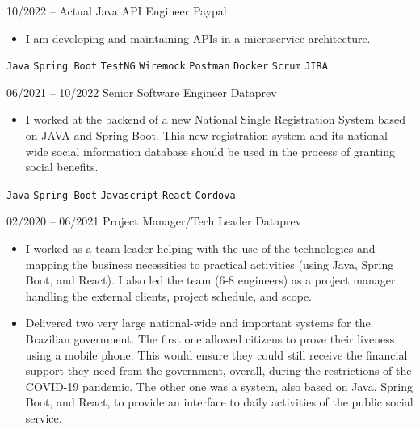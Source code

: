 \begin{entrylist}

	\entry
        {10/2022 -- Actual}
		{Java API Engineer}
		{Paypal} 
		{\vspace{-10pt}
        \begin{itemize}[noitemsep,topsep=0pt,parsep=0pt,partopsep=0pt, leftmargin=-1pt]
            \item I am developing and maintaining APIs in a microservice architecture. 
        \end{itemize} 
        \texttt{Java} \slashsep \texttt{Spring Boot} \slashsep \texttt{TestNG} \slashsep  \texttt{Wiremock} \slashsep \texttt{Postman} \slashsep \texttt{Docker} \slashsep \texttt{Scrum} \slashsep \texttt{JIRA}
        }

	\entry
        {06/2021 -- 10/2022}
		{Senior Software Engineer}
		{Dataprev}
		{
                \vspace{-10pt}
                \begin{itemize}[noitemsep,topsep=0pt,parsep=0pt,partopsep=0pt, leftmargin=-1pt]
                    \item I worked at the backend of a new National Single Registration System based on JAVA and Spring Boot. This new registration system and its national-wide social information database should be used in the process of granting social benefits.  
                \end{itemize} 
                \texttt{Java} \slashsep \texttt{Spring Boot} \slashsep \texttt{Javascript} \slashsep \texttt{React} \slashsep \texttt{Cordova} 
        }

	\entry
        {02/2020 -- 06/2021}
		{Project Manager/Tech Leader}
		{Dataprev}
		{
                \vspace{-10pt}
                \begin{itemize}[noitemsep,topsep=0pt,parsep=0pt,partopsep=0pt, leftmargin=-1pt]
                    \item I worked as a team leader helping with the use of the technologies and mapping the business necessities to practical activities (using Java, Spring Boot, and React). I also led the team (6-8 engineers) as a project manager handling the external clients, project schedule, and scope.
                    \item Delivered two very large national-wide and important systems for the Brazilian government. The first one allowed citizens to prove their liveness using a mobile phone. This would ensure they could still receive the financial support they need from the government, overall, during the restrictions of the COVID-19 pandemic. The other one was a system, also based on Java, Spring Boot, and React, to provide an interface to daily activities of the public social service. 


\end{itemize}}
\end{entrylist}
